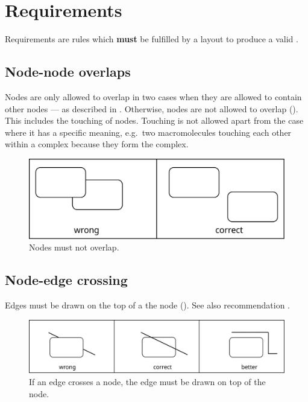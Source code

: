 \section{Requirements}

Requirements are rules which \textbf{must} be fulfilled by a layout to
produce a valid \PDm.

\subsection{Node-node overlaps}

Nodes are only allowed to overlap in two cases when they are allowed
to contain other nodes --- as described in . Otherwise,
nodes are not allowed to overlap (). This includes the
touching of nodes. Touching is not allowed apart from the case where
it has a specific meaning, e.g.\, two macromolecules touching each
other within a complex because they form the complex.

\begin{figure}[htb]
  \centering
  \includegraphics[scale=0.3]{images/layout-node-node}
  \caption{Nodes must not overlap.}\label{fig:layout1}
\end{figure}

\subsection{Node-edge crossing}\label{crosEdNoRe}

Edges must be drawn on the top of a the node (). See also recommendation .

\begin{figure}[htb]
  \centering
  \includegraphics[scale=0.3]{images/layout-node-edge}
  \caption{If an edge crosses a node, the edge must be drawn on top
  of the node.}\label{fig:layout2}
\end{figure}

